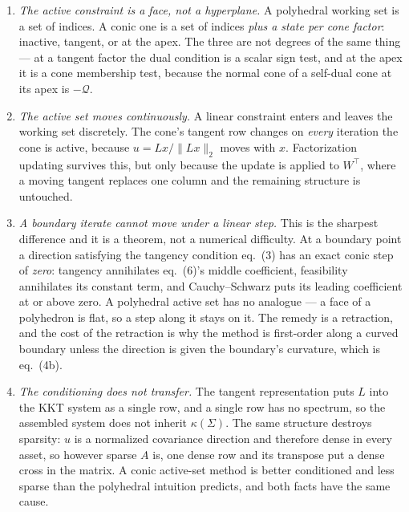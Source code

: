 \documentclass[11pt,a4paper]{article}
\begin{document}
\begin{enumerate}
    \item \emph{The active constraint is a face, not a hyperplane.} A
    polyhedral working set is a set of indices. A conic one is a set
    of indices \emph{plus a state per cone factor}: inactive, tangent,
    or at the apex. The three are not degrees of the same thing --- at
    a tangent factor the dual condition is a scalar sign test, and at
    the apex it is a cone membership test, because the normal cone of
    a self-dual cone at its apex is $-\mathcal Q$.

    \item \emph{The active set moves continuously.} A linear
    constraint enters and leaves the working set discretely. The
    cone's tangent row changes on \emph{every} iteration the cone is
    active, because $u=Lx/\|Lx\|_2$ moves with $x$. Factorization
    updating survives this, but only because the update is applied to
    $W^\top$, where a moving tangent replaces one column and the
    remaining structure is untouched.

    \item \emph{A boundary iterate cannot move under a linear step.}
    This is the sharpest difference and it is a theorem, not a
    numerical difficulty. At a boundary point a direction satisfying
    the tangency condition eq.~(3) has an exact conic step of
    \emph{zero}: tangency annihilates eq.~(6)'s middle coefficient,
    feasibility annihilates its constant term, and Cauchy--Schwarz puts
    its leading coefficient at or above zero. A polyhedral active set
    has no analogue --- a face of a polyhedron is flat, so a step along
    it stays on it. The remedy is a retraction, and the cost of the
    retraction is why the method is first-order along a curved
    boundary unless the direction is given the boundary's curvature,
    which is eq.~(4b).

    \item \emph{The conditioning does not transfer.} The tangent
    representation puts $L$ into the KKT system as a single row, and a
    single row has no spectrum, so the assembled system does not
    inherit $\kappa(\Sigma)$. The same structure destroys sparsity: $u$
    is a normalized covariance direction and therefore dense in every
    asset, so however sparse $A$ is, one dense row and its transpose
    put a dense cross in the matrix. A conic active-set method is
    better conditioned and less sparse than the polyhedral intuition
    predicts, and both facts have the same cause.
\end{enumerate}
\end{document}
